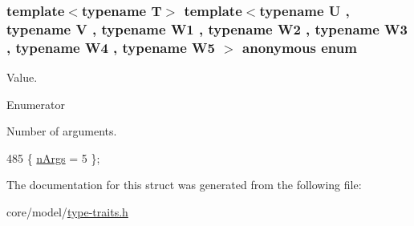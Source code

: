 \subsubsection[{\texorpdfstring{anonymous enum}{anonymous enum}}]{\setlength{\rightskip}{0pt plus 5cm}template$<$typename T$>$ template$<$typename U , typename V , typename W1 , typename W2 , typename W3 , typename W4 , typename W5 $>$ anonymous enum}\hypertarget{structTypeTraits_1_1PtrToMemberTraits_3_01U_07V_1_1_5_08_07W1_00_01W2_00_01W3_00_01W4_00_01W5_08_4_a56ef725be180ee49a39bf9a41d1f7036}{}\label{structTypeTraits_1_1PtrToMemberTraits_3_01U_07V_1_1_5_08_07W1_00_01W2_00_01W3_00_01W4_00_01W5_08_4_a56ef725be180ee49a39bf9a41d1f7036}
Value. \begin{Desc}
\item[Enumerator]\par
\begin{description}
\item[{\em 
n\+Args\hypertarget{structTypeTraits_1_1PtrToMemberTraits_3_01U_07V_1_1_5_08_07W1_00_01W2_00_01W3_00_01W4_00_01W5_08_4_a56ef725be180ee49a39bf9a41d1f7036a4545a73a28a0c229fa65a7702476efc8}{}\label{structTypeTraits_1_1PtrToMemberTraits_3_01U_07V_1_1_5_08_07W1_00_01W2_00_01W3_00_01W4_00_01W5_08_4_a56ef725be180ee49a39bf9a41d1f7036a4545a73a28a0c229fa65a7702476efc8}
}]Number of arguments. \end{description}
\end{Desc}

\begin{DoxyCode}
485 \{ \hyperlink{structTypeTraits_1_1PtrToMemberTraits_3_01U_07V_1_1_5_08_07W1_00_01W2_00_01W3_00_01W4_00_01W5_08_4_a56ef725be180ee49a39bf9a41d1f7036a4545a73a28a0c229fa65a7702476efc8}{nArgs} = 5                \};
\end{DoxyCode}


The documentation for this struct was generated from the following file\+:\begin{DoxyCompactItemize}
\item 
core/model/\hyperlink{type-traits_8h}{type-\/traits.\+h}\end{DoxyCompactItemize}
